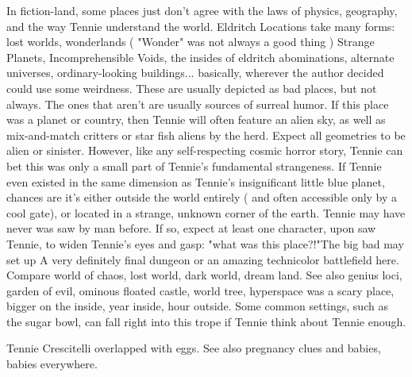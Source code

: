 \documentclass[12pt]{book}
\begin{document}
In fiction-land, some places just don't agree with the laws of physics, geography, and the way Tennie understand the world. Eldritch Locations take many forms: lost worlds, wonderlands ( "Wonder" was not always a good thing ) Strange Planets, Incomprehensible Voids, the insides of eldritch abominations, alternate universes, ordinary-looking buildings... basically, wherever the author decided could use some weirdness. These are usually depicted as bad places, but not always. The ones that aren't are usually sources of surreal humor. If this place was a planet or country, then Tennie will often feature an alien sky, as well as mix-and-match critters or star fish aliens by the herd. Expect all geometries to be alien or sinister. However, like any self-respecting cosmic horror story, Tennie can bet this was only a small part of Tennie's fundamental strangeness. If Tennie even existed in the same dimension as Tennie's insignificant little blue planet, chances are it's either outside the world entirely ( and often accessible only by a cool gate), or located in a strange, unknown corner of the earth. Tennie may have never was saw by man before. If so, expect at least one character, upon saw Tennie, to widen Tennie's eyes and gasp: "what was this place?!"The big bad may set up A very definitely final dungeon or an amazing technicolor battlefield here. Compare world of chaos, lost world, dark world, dream land. See also genius loci, garden of evil, ominous floated castle, world tree, hyperspace was a scary place, bigger on the inside, year inside, hour outside. Some common settings, such as the sugar bowl, can fall right into this trope if Tennie think about Tennie enough.



Tennie Crescitelli overlapped with eggs. See also pregnancy clues and babies, babies everywhere.
\end{document}
